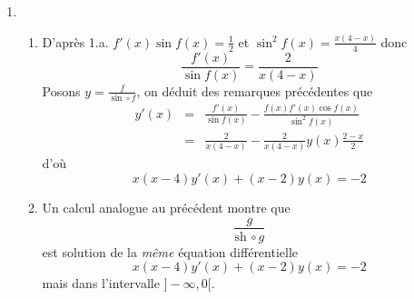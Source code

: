 \begin{enumerate}
\begin{enumerate}
    \end{enumerate}
  \item
    \begin{enumerate}
     \item D'apr{\`e}s 1.a. $f'(x) \sin f(x)=\frac{1}{2}$  et $\sin^2 f(x)=\frac{x(4-x)}{4}$ donc
     \[\frac{f'(x)}{\sin f(x)}=\frac{2}{x(4-x)}\]
     Posons $y=\frac{f}{\sin \circ f}$, on d{\'e}duit des remarques
     pr{\'e}c{\'e}dentes que
     \begin{eqnarray*}
     y'(x)&=&\frac{f'(x)}{\sin f(x)}-\frac{f(x)f'(x)\cos f(x)}{\sin ^2
     f(x)}\\
     &=&\frac{2}{x(4-x)}-\frac{2}{x(4-x)}y(x)\frac{2-x}{2}
     \end{eqnarray*}
     d'o{\`u}
     \[x(x-4)y'(x)+(x-2)y(x)=-2\]
     \item Un calcul analogue au pr{\'e}c{\'e}dent montre que
     \[\frac{g}{\mathrm{sh\,}\circ g}\]
     est solution de la \emph{m{\^e}me} {\'e}quation diff{\'e}rentielle
     \[x(x-4)y'(x)+(x-2)y(x)=-2\]
     mais dans l'intervalle $]-\infty,0[$.
    \end{enumerate}

\end{enumerate}
